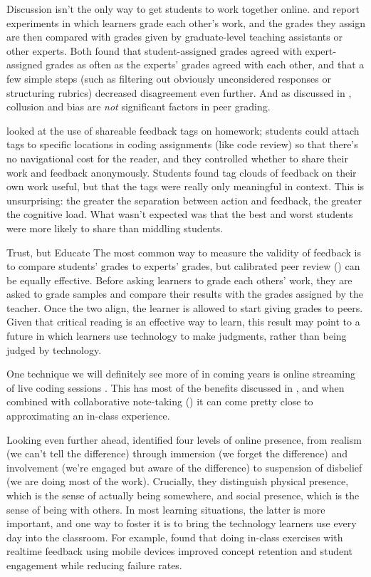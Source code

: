 Discussion isn't the only way to get students to work together online.
\cite{Pare2008} and \cite{Kulk2013} report experiments in which
learners grade each other's work, and the grades they assign are then
compared with grades given by graduate-level teaching assistants or
other experts. Both found that student-assigned grades agreed with
expert-assigned grades as often as the experts' grades agreed with each
other, and that a few simple steps (such as filtering out obviously
unconsidered responses or structuring rubrics) decreased disagreement
even further. And as discussed in ,
collusion and bias are \emph{not} significant factors in peer grading.

\cite{Cumm2011} looked at the use of shareable feedback tags on
homework; students could attach tags to specific locations in coding
assignments (like code review) so that there's no navigational cost for
the reader, and they controlled whether to share their work and feedback
anonymously. Students found tag clouds of feedback on their own work
useful, but that the tags were really only meaningful in context. This
is unsurprising: the greater the separation between action and feedback,
the greater the cognitive load. What wasn't expected was that the best
and worst students were more likely to share than middling students.

\begin{aside}{Trust, but Educate}
  The most common way to measure the validity of feedback is to compare
  students' grades to experts' grades, but calibrated peer review
  () can be equally effective. Before
  asking learners to grade each others' work, they are asked to grade
  samples and compare their results with the grades assigned by the
  teacher. Once the two align, the learner is allowed to start giving
  grades to peers. Given that critical reading is an effective way to
  learn, this result may point to a future in which learners use
  technology to make judgments, rather than being judged by technology.
\end{aside}

One technique we will definitely see more of in coming years is online
streaming of live coding sessions \cite{Haar2017}. This has most of
the benefits discussed in , and when
combined with collaborative note-taking
() it can come pretty close to
approximating an in-class experience.

Looking even further ahead, \cite{Ijss2000} identified four levels of
online presence, from realism (we can't tell the difference) through
immersion (we forget the difference) and involvement (we're engaged but
aware of the difference) to suspension of disbelief (we are doing most
of the work). Crucially, they distinguish physical presence, which is
the sense of actually being somewhere, and social presence, which is the
sense of being with others. In most learning situations, the latter is
more important, and one way to foster it is to bring the technology
learners use every day into the classroom. For example,
\cite{Deb2018} found that doing in-class exercises with realtime
feedback using mobile devices improved concept retention and student
engagement while reducing failure rates.

